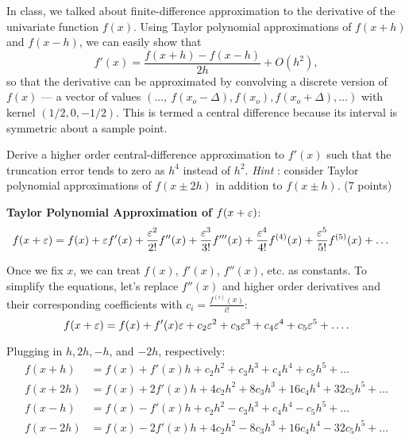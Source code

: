 \begin{problem}
  In class, we talked about finite-difference approximation
  to the derivative of the univariate function $f(x)$.
  Using Taylor polynomial approximations of $f(x + h)$ and $f(x - h)$,
  we can easily show that \[ f'(x) = \frac{f(x + h) - f(x - h)}{2h} + O(h^2), \]
  so that the derivative can be approximated by convolving
  a discrete version of $f(x)$ --- a vector of values
  $(\ldots,\ f(x_{o} - \Delta), f(x_{o}), f(x_{o}+ \Delta), \ldots)$
  with kernel $(1/2, 0, -1/2)$.
  This is termed a central difference because its interval is symmetric about a sample point.

  \begin{enumroman}
    \item Derive a higher order central-difference approximation
      to $f'(x)$ such that the truncation error tends to zero
      as $h^4$ instead of $h^2$.
      \emph{Hint} : consider Taylor polynomial approximations of $f(x \pm 2h)$
        in addition to $f(x \pm h)$. (7 points)
      \begin{Answer}
        \textbf{Taylor Polynomial Approximation of $f(x + \varepsilon)$}:
        \begin{align*}
          f(x + \varepsilon) &= f(x) + \varepsilon f'(x) + \frac{\varepsilon^2}{2!} f''(x) + \frac{\varepsilon^3}{3!} f'''(x) + \frac{\varepsilon^4}{4!} f^{(4)}(x) + \frac{\varepsilon^5}{5!} f^{(5)}(x) + \ldots
        \end{align*}

        Once we fix $x$, we can treat $f(x)$, $f'(x)$, $f''(x)$, etc. as constants.
        To simplify the equations, let's replace $f''(x)$ and higher order derivatives and their
        corresponding coefficients with $\displaystyle c_i = \frac{f^{(i)}(x)}{i!}$:
        \[
          f(x + \varepsilon) = f(x) + f'(x) \varepsilon + c_2 \varepsilon^2 +c_3 \varepsilon^3 + c_4 \varepsilon^4 + c_5 \varepsilon^5 + \ldots.
        \]

        Plugging in $h, 2h, -h$, and $-2h$, respectively:
        \begin{align*}
          f(x + h) &= f(x) + f'(x) h + c_2 h^2 + c_3 h^3 + c_4 h^4 + c_5 h^5 + \ldots \\
          f(x + 2h) &= f(x) + 2f'(x)h + 4c_2h^2 + 8c_3h^3 + 16c_4h^4 + 32c_5h^5 + \ldots \\
          f(x - h) &= f(x) - f'(x) h + c_2 h^2 - c_3 h^3 + c_4 h^4 - c_5 h^5 + \ldots \\
          f(x - 2h) &= f(x) - 2f'(x)h + 4c_2h^2 - 8c_3h^3 + 16c_4h^4 - 32c_5h^5 + \ldots
        \end{align*}


\end{Answer}
\end{enumroman}
\end{problem}
